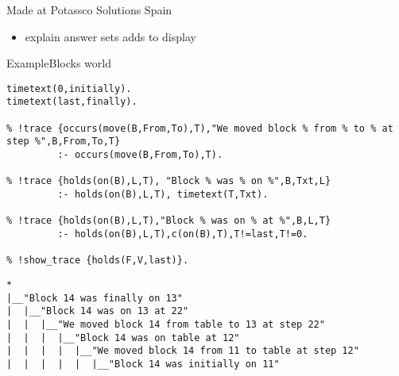 \begin{frame}{\xclingo}{Made at Potassco Solutions Spain}
  \begin{itemize}
  \item <1-> explain answer sets
      adds  to display  
  \end{itemize}
\end{frame}
\begin{frame}{Example}{Blocks world}
\pause
\begin{lstlisting}[language=clingo,basicstyle=\scriptsize\ttfamily]
timetext(0,initially).
timetext(last,finally).

% !trace {occurs(move(B,From,To),T),"We moved block % from % to % at step %",B,From,To,T}
         :- occurs(move(B,From,To),T).

% !trace {holds(on(B),L,T), "Block % was % on %",B,Txt,L}
         :- holds(on(B),L,T), timetext(T,Txt).

% !trace {holds(on(B),L,T),"Block % was on % at %",B,L,T}
         :- holds(on(B),L,T),c(on(B),T),T!=last,T!=0.

% !show_trace {holds(F,V,last)}.
\end{lstlisting}
\pause
\begin{lstlisting}[language=clingo,basicstyle=\scriptsize\ttfamily]
*
|__"Block 14 was finally on 13"
|  |__"Block 14 was on 13 at 22"
|  |  |__"We moved block 14 from table to 13 at step 22"
|  |  |  |__"Block 14 was on table at 12"
|  |  |  |  |__"We moved block 14 from 11 to table at step 12"
|  |  |  |  |  |__"Block 14 was initially on 11"
\end{lstlisting}
\end{frame}
%
